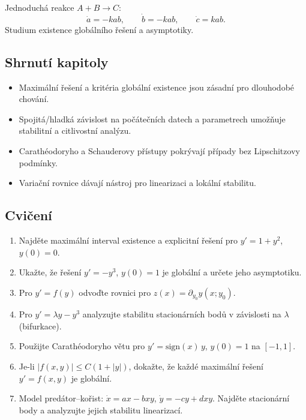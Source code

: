 \begin{example}
\label{ex:chemicke-reakce}
Jednoduchá reakce $A+B\to C$: 
\[
\dot a=-kab,\qquad \dot b=-kab,\qquad \dot c=kab.
\]
Studium existence globálního řešení a asymptotiky.
\end{example}

\spc

\subsection*{Shrnutí kapitoly}
\begin{itemize}
\item Maximální řešení a kritéria globální existence jsou zásadní pro dlouhodobé chování.
\item Spojitá/hladká závislost na počátečních datech a parametrech umožňuje stabilitní a citlivostní analýzu.
\item Carathéodoryho a Schauderovy přístupy pokrývají případy bez Lipschitzovy podmínky.
\item Variační rovnice dávají nástroj pro linearizaci a lokální stabilitu.
\end{itemize}

\spc

\subsection*{Cvičení}
\begin{enumerate}
\item Najděte maximální interval existence a explicitní řešení pro $y'=1+y^2$, $y(0)=0$.
\item Ukažte, že řešení $y'=-y^3$, $y(0)=1$ je globální a určete jeho asymptotiku.
\item Pro $y'=f(y)$ odvoďte rovnici pro $z(x)=\partial_{y_0}y(x;y_0)$.
\item Pro $y'=\lambda y - y^3$ analyzujte stabilitu stacionárních bodů v závislosti na $\lambda$ (bifurkace).
\item Použijte Carathéodoryho větu pro $y'=\mathrm{sign}(x)\,y$, $y(0)=1$ na $[-1,1]$.
\item Je-li $|f(x,y)|\le C(1+|y|)$, dokažte, že každé maximální řešení $y'=f(x,y)$ je globální.
\item Model predátor–kořist: $\dot x=ax-bxy$, $\dot y=-cy+dxy$. Najděte stacionární body a analyzujte jejich stabilitu linearizací.
\end{enumerate}
